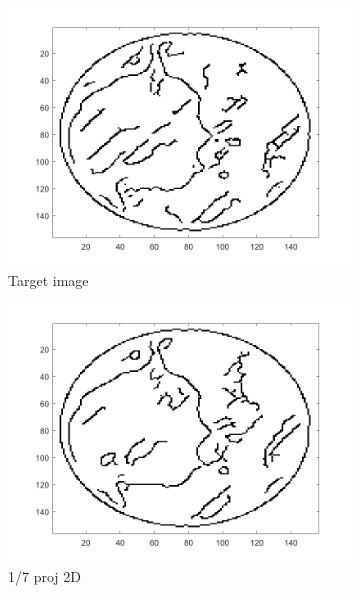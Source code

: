 \begin{figure}[ht!]
      		\begin{subfigure}[b]{0.24\textwidth}
            	\centering
            	\includegraphics[width=\textwidth]{../../data/res/target1_edges.png}
            	\caption{Target image}    
        	\end{subfigure}
        	\begin{subfigure}[b]{0.24\textwidth}  
            	\centering 
            	\includegraphics[width=\textwidth]{../../data/res/SB_Reconstruction/Edges/2D/it250_proj1_7.png}
            	\caption{1/7 proj 2D}    
            	\label{subfig:156p1L-D}
        	\end{subfigure}
        	\begin{subfigure}[b]{0.24\textwidth}  

\end{subfigure}
\end{figure}
